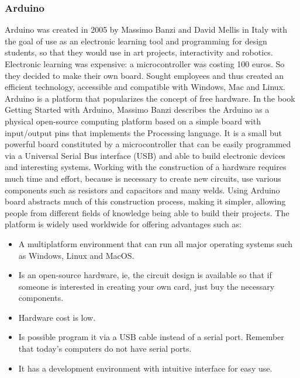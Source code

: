 \documentclass{acm_proc_article-sp}
\begin{document}
\subsubsection{Arduino}
Arduino was created in 2005 by Massimo Banzi and David Mellis in Italy with the goal of use as an electronic learning tool and programming for design students, so that they would use in art projects, interactivity and robotics. Electronic learning was expensive: a microcontroller was costing 100 euros. So they decided to make their own board. Sought employees and thus created an efficient technology, accessible and compatible with Windows, Mac and Linux.
\newline
\newline
Arduino is a platform that popularizes the concept of free hardware. In the book Getting Started with Arduino, Massimo Banzi describes the Arduino as a physical open-source computing platform based on a simple board with input/output pins that implements the Processing language. It is a small but powerful board constituted by a microcontroller that can be easily programmed via a Universal Serial Bus interface (USB) and able to build electronic devices and interesting systems.
\newline
\newline
Working with the construction of a hardware requires much time and effort, because is necessary to create new circuits, use various components such as resistors and capacitors and many welds. Using Arduino board abstracts much of this construction process, making it simpler, allowing people from different fields of knowledge being able to build their projects. The platform is widely used worldwide for offering advantages such as:


\begin{itemize}
\item A multiplatform environment that can run all major operating systems such as Windows, Linux and MacOS.
\item Is an open-source hardware, ie, the circuit design is available so that if someone is interested in creating your own card, just buy the necessary components.		
\item Hardware cost is low.					
\item Is possible program it via a USB cable instead of a serial port. Remember that today's computers do not have serial ports.	
\item It has a development environment with intuitive interface for easy use.
\end{itemize}
\end{document}
